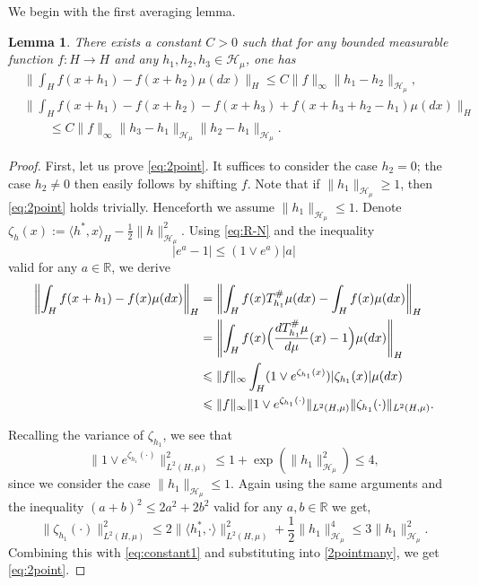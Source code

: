 \documentclass[11pt,a4paper]{article}
\newcommand{\R}{\mathbb{R}}
\renewcommand{\H}{\mathcal{H}}
\renewcommand{\le}{\leqslant}
\newcommand{\CM}{\H_\mu}
\newcommand{\nn}{\nonumber}
\numberwithin{equation}{section}
\theoremstyle{definition}
\theoremstyle{remark}
\theoremstyle{plain}
\newtheorem{lemma}[definition]{Lemma}
\begin{document}
We begin with the first averaging lemma.
\begin{lemma} \label{lem:averagingproperties}
There exists a constant $C>0$ such that for any bounded measurable function $f\colon H\to H$ and any $h_1,h_2,h_3 \in \mathcal{H}_{\mu}$, one has
\begin{align}
&\Big\|\int_H f(x+h_1)-f(x+h_2) \mu(dx)\Big\|_{H}\leqslant C\|f\|_\infty \|h_1-h_2\|_{\CM} \label{eq:2point},\\
&\Big\|\int_H f(x+h_1)-f(x+h_2)-f(x+h_3)+f(x+h_3+h_2-h_1) \mu(dx)\Big\|_{H} \nonumber\\
    &\qquad\le C \|f\|_\infty \|h_3-h_1\|_{\CM} \|h_2-h_1\|_{\CM}. \label{eq:4point}
\end{align}
\end{lemma}
\begin{proof}
First, let us prove  \eqref{eq:2point}.
It suffices to consider the case $h_2=0$; the case $h_2\neq 0$ then easily follows by shifting $f$. Note that if $\|h_1\|_{\CM}\geqslant 1$, then \eqref{eq:2point} holds trivially. Henceforth we assume $\|h_1\|_{\CM}\le1$. Denote $\zeta_h(x):=\langle h^*,x\rangle_H-\frac{1}{2}\|h\|_{\CM}^2$. 
Using \eqref{eq:R-N} and the inequality
\begin{equation}\label{eq:very-triv}
     |e^{a}-1|\le (1\vee e^{a})|a|
\end{equation}
valid for any $a\in \R$, we derive
\begin{align}\label{2pointmany}
\left\|\int_H f(x+h_1)-f(x)\mu(dx)\right\|_{H}&=\left\|\int_H f(x)  T_{h_1}^\#\mu (dx)-\int_H f(x)\mu(dx)\right\|_{H}\nn\\
&=\left\|\int_H f(x)\Bigl(\frac{d T_{h_1}^\# \mu}{d \mu}(x)-1\Bigr) \mu(dx)\right\|_{H}\nn\\
&\leqslant \|f\|_\infty \int_H (1\vee e^{\zeta_{h_1}(x)}) |\zeta_{h_1}(x)|\mu(dx)\nn\\
&\leqslant \|f\|_\infty \|1\vee e^{\zeta_{h_1}(\cdot)}\|_{L^2(H,\mu)} \|\zeta_{h_1}(\cdot)\|_{L^2(H,\mu)}.
\end{align}


Recalling the variance of $\zeta_{h_1}$, we see that 
\begin{equation}\label{eq:constant1}
\|1\vee e^{\zeta_{h_1}(\cdot)}\|_{L^2(H,\mu)}^2
\le 1+\exp(\|h_1\|^2_{\CM})\le 4,
\end{equation}
since we consider the case $\|h_1\|_{\CM}\le1$. 
Again using the same arguments and the inequality $(a+b)^2\le 2 a^2 +2 b^2$ valid for any $a,b\in\R$ we get,
\begin{equation}\label{eq:constant2}
\|\zeta_{h_1}(\cdot)\|_{L^2(H,\mu)}^2\le 2 
 \|\langle h_1^*,\cdot\rangle \|_{L^2(H,\mu)}^2 +\frac12\|h_1\|_{\CM}^4 \le 3\|h_1\|_{\CM}^2.
\end{equation}
Combining this with \eqref{eq:constant1} and substituting into \eqref{2pointmany}, we get  \eqref{eq:2point}.


\end{proof}
\end{document}
